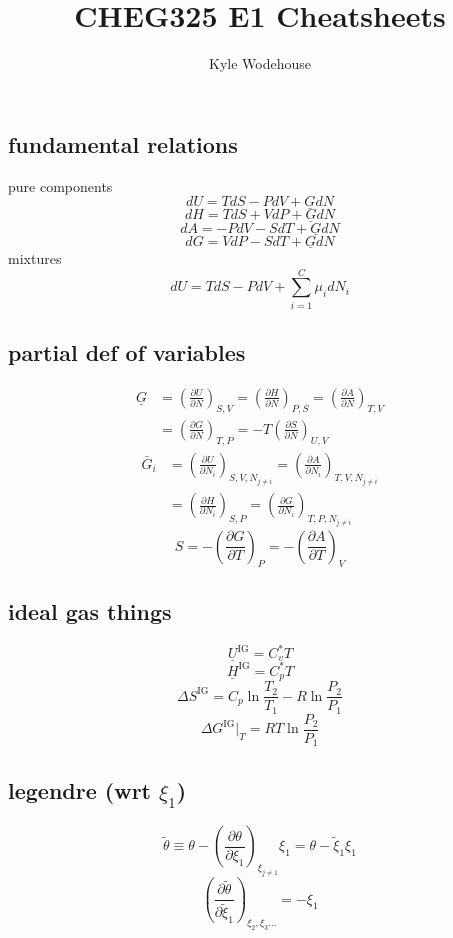 \documentclass{article}
\title{\bfseries CHEG325 E1 Cheatsheets}
\author{Kyle Wodehouse}
\date{}
\begin{document}
\maketitle

\begin{minipage}[t]{0.5\textwidth}
     \subsection*{fundamental relations}
        pure components
        \[
        dU = TdS - PdV + \underline{G} dN
        \]
        \[
        dH = T dS + V dP + \underline{G} dN
        \]
        \[
        dA = -P dV - S dT + \underline{G} dN
        \]
        \[
        dG = V dP - S dT + \underline{G} dN
        \]
        mixtures 
        \[
        dU = T dS - P dV + \sum^C_{i=1} {\mu}_{i} dN_{i}
        \]
    \subsection*{partial def of variables}

    \begin{align*}
    \underline{G} &= \left(\frac{\partial U}{\partial N}\right)_{S,V} = \left(\frac{\partial H}{\partial N}\right)_{P,S} = \left(\frac{\partial A}{\partial N}\right)_{T,V} \\[6pt]
                 &= \left(\frac{\partial G}{\partial N}\right)_{T,P} = -T\left(\frac{\partial S}{\partial N}\right)_{U,V}
    \end{align*}
    \begin{align*}
    \bar{G}_{i}  &= \left(\frac{ \partial U }{ \partial N_{i} } \right)_{S,V,N_{j\neq i}}
                  = \left(\frac{ \partial A }{ \partial N_{i} } \right)_{T,V,N_{j \neq i}} \\
                 &= \left(\frac{ \partial H }{ \partial N_{i} } \right)_{S,P}
                  = \left(\frac{ \partial G }{ \partial N_{i} } \right)_{T,P,N_{j \neq i}}
    \end{align*}
    \[
    S =  -\left(\frac{ \partial G }{ \partial T } \right)_{P} = -\left(\frac{ \partial A }{ \partial T } \right)_{V} 
    \]
    \subsection*{ideal gas things}
    \[\underline{U}^{\text{IG}}  = C_v^* T\]
    \[\underline{H}^{\text{IG}}  = C_p^* T\]
    \[\Delta S^{\text{IG}} = C_p \ln \frac{T_2}{T_1} - R \ln \frac{P_2}{P_1}\]
    \[\Delta G^{\text{IG}} \biggl\lvert_T = RT \ln \frac{P_2}{P_1}\]
    \subsection*{legendre (wrt $\xi_1$)}
    \[\tilde{\theta} \equiv \theta - \left(\frac{ \partial \theta }{ \partial \xi_{1} } \right)_{\xi_{j \neq 1}} \xi_{1} = \theta - \tilde{\xi}_{1} \xi_{1}  \]
    \[\left(\frac{ \partial \tilde{\theta} }{ \partial \tilde{\xi}_{1} } \right)_{\xi_{2}, \xi_{3}\dots}  = - \xi_{1}\]
\end{minipage}
\end{document}
